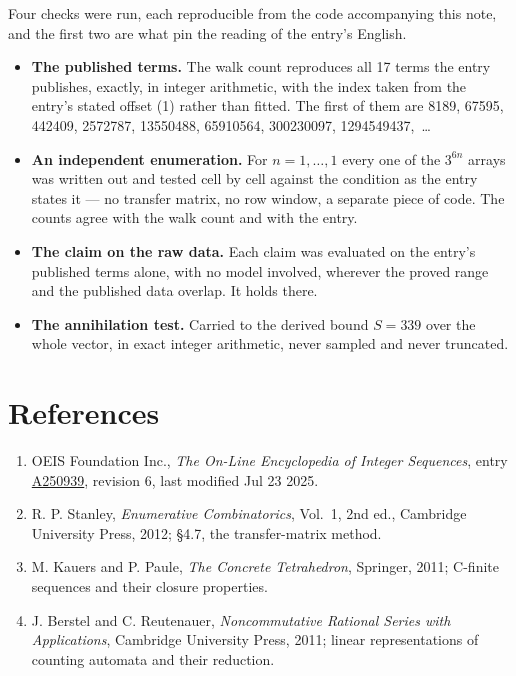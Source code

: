 \documentclass[11pt]{article}
\theoremstyle{definition}
\begin{document}
Four checks were run, each reproducible from the code accompanying this note, and the first two are what pin the reading of the entry's English.

\begin{itemize}

\item {\bfseries The published terms.} The walk count reproduces all 17 terms the entry publishes, exactly, in integer arithmetic, with the index taken from the entry's stated offset (1) rather than fitted. The first of them are 8189, 67595, 442409, 2572787, 13550488, 65910564, 300230097, 1294549437,~\dots

\item {\bfseries An independent enumeration.} For $n = 1,\dots,1$ every one of the $3^{6n}$ arrays was written out and tested cell by cell against the condition as the entry states it --- no transfer matrix, no row window, a separate piece of code. The counts agree with the walk count and with the entry.

\item {\bfseries The claim on the raw data.} Each claim was evaluated on the entry's published terms alone, with no model involved, wherever the proved range and the published data overlap. It holds there.

\item {\bfseries The annihilation test.} Carried to the derived bound $S = 339$ over the whole vector, in exact integer arithmetic, never sampled and never truncated.

\end{itemize}

\section{References}

\begin{enumerate}

\item OEIS Foundation Inc., \emph{The On-Line Encyclopedia of Integer Sequences}, entry \href{https://oeis.org/A250939}{A250939}, revision 6, last modified Jul 23 2025.

\item R. P. Stanley, \emph{Enumerative Combinatorics}, Vol.~1, 2nd ed., Cambridge University Press, 2012; \S4.7, the transfer-matrix method.

\item M. Kauers and P. Paule, \emph{The Concrete Tetrahedron}, Springer, 2011; C-finite sequences and their closure properties.

\item J. Berstel and C. Reutenauer, \emph{Noncommutative Rational Series with Applications}, Cambridge University Press, 2011; linear representations of counting automata and their reduction.

\end{enumerate}
\end{document}
